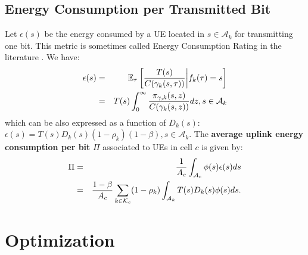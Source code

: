 \documentclass[draftcls,onecolumn]{IEEEtran}
\theoremstyle{plain}
\theoremstyle{definition}
\def\config{\mathbf{x}}
\def\objective{{\Pi}} \def\constraint{{\cal D}}
\def\constraintmax{D_{\mbox{{\tiny max}}}}
\def\multiplier{\mu}
\def\augmented{{\cal F}}
\def\feasable{\tilde{\Omega}}
\def\objective{{\Pi}} \def\constraint{D_c} \def\constraintmax{D_{\mbox{{\tiny max}}}}
\def\multiplier{\mu}
\def\augmented{{\cal F}}
\def\feasable{\tilde{\Omega}}
\def\slack{t}
\def\Real{\mathbb{R}}
\def\st{\mbox{ s.t. }} \def\ie{\mbox{\em i.e., }} \def\wrt{\mbox{\em wrt. }}
\def\Real{\mathbb{R}}
\def\st{\mbox{ s.t. }} \def\ie{\mbox{\em i.e., }}
\def\ul{\underline}
\def\ra{\rightarrow}
\def\bbbone{{\mathchoice {\rm 1\mskip-4mu l} {\rm 1\mskip-4mu l} {\rm
1\mskip-4.5mu l} {\rm 1\mskip-5mu l}}}
\def\charact{\bbbone}
\def\dsp{\displaystyle}
\def\cond{\ |\ }
\begin{document}
\subsection{Energy Consumption per Transmitted Bit}
Let $\epsilon(s)$ be the energy consumed by a UE located in $s\in \mathcal{A}_{k}$ for transmitting one bit. This metric is sometimes called Energy Consumption Rating in the literature \cite{Suarez12, Han11}. We have:
\begin{eqnarray}
  \epsilon(s)&=&\mathbb{E}_{\tau} \left[ \frac{T(s)}{C(\gamma_k(s,\tau))}\middle | f_k(\tau)=s \right] \notag \\
  &=&T(s)\displaystyle \int_{0}^{\infty} \frac{\pi_{\gamma,k}(s,z)}{C(\gamma_k(s,z))}{dz},s\in \mathcal{A}_k
\end{eqnarray}
which can be also expressed as a function of $D_k(s)$:
$\epsilon(s)=T(s) D_k(s)(1-\rho_k)(1-\beta), s\in \mathcal{A}_k$.
The {\bf average uplink energy consumption per bit} $\Pi$ associated to UEs in cell $c$ is given by:
\begin{eqnarray} \label{eq:ee}
 \Pi &=&\frac{1}{A_c}\displaystyle \int_{\mathcal{A}_c} \phi(s)\epsilon(s){ds} \notag \\
 &=& \frac{1-\beta}{A_c}\displaystyle \sum_{k \in \mathcal{K}_c} (1-\rho_k) \label{eq:ee}\int_{\mathcal{A}_k} T(s)D_k(s) \phi(s){ds}.
\end{eqnarray}



 
\section{Optimization} \label{optimization}



\def\config#1{\boldsymbol{#1}}
\def\objective{{\Pi}} \def\constraint{D_c} \def\constraintmax{D_{\mbox{{\tiny max}}}}
\def\prior{V}
\def\multiplier{\mu}
\def\augmented{{\cal F}}
\def\feasable{\tilde{\Omega}}

\def\slack{t}

\def\Real{\mathbb{R}}
\def\st{\mbox{ s.t. }} \def\ie{\mbox{\em i.e., }} \def\wrt{\mbox{\em wrt. }} 

\def\ul{\underline}
\def\ra{\rightarrow}


\def\charact{\bbbone}
\def\dsp{\displaystyle}
\def\cond{\ |\ }
\def\Ra{\Rightarrow}

\def\ra{\rightarrow}
\def\Ra{\Rightarrow}
\def\lra{\leftrightarrow}
\def\Lra{\Leftrightarrow}

\def\ie{\hspace*{-1mm}\mbox{, {\em i.e.,} }} 
\def\dsp{\displaystyle}
\end{document}
